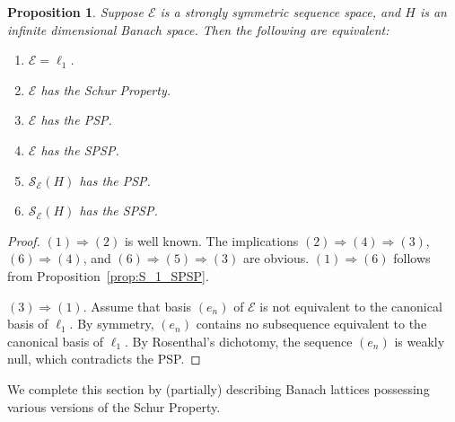 \documentclass[12pt]{amsart}
\theoremstyle{plain}
\newtheorem{proposition}[theorem]{Proposition}
\theoremstyle{definition}
\newtheorem{remark}[theorem]{Remark}
\newcommand{\is}{\mathcal S}
\newcommand{\ce}{\mathcal E}
\newcommand{\se}{{\mathcal S}_{\mathcal{E}}}
\begin{document}




\begin{proposition}\label{prop:se_PSP}
Suppose $\ce$ is a strongly symmetric sequence space, and $H$
is an infinite dimensional Banach space.
Then the following are equivalent:
\begin{enumerate}
\item $\ce=\ell_1$.
\item $\ce$ has the Schur Property.
\item $\ce$ has the PSP.
\item $\ce$ has the SPSP.
\item $\se(H)$ has the PSP.
\item $\se(H)$ has the SPSP.
\end{enumerate}
\end{proposition}

\begin{proof}
$(1) \Rightarrow (2)$ is well known. The implications
$(2) \Rightarrow (4) \Rightarrow (3)$, $(6) \Rightarrow (4)$,
and $(6) \Rightarrow (5) \Rightarrow (3)$ are obvious.
$(1) \Rightarrow (6)$ follows from Proposition~\ref{prop:S_1_SPSP}.

$(3) \Rightarrow (1)$. Assume that basis $(e_n)$ of $\ce$ is not equivalent
to the canonical basis of $\ell_1$. By symmetry, $(e_n)$ contains
no subsequence equivalent to the canonical basis of $\ell_1$. By
Rosenthal's dichotomy, the sequence $(e_n)$ is weakly null,
which contradicts the PSP.
\end{proof}

We complete this section by (partially) describing Banach lattices possessing various
versions of the Schur Property.
\end{document}
